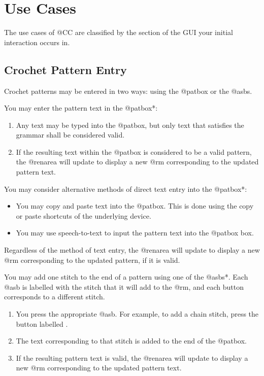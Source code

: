 \documentclass[main.tex]{subfiles}
\begin{document}
\chapter{Use Cases}\label{chp:use}

The use cases of @CC are classified by the section of the GUI your initial interaction occurs in.

\section{Crochet Pattern Entry}

Crochet patterns may be entered in two ways: using the @patbox or the @asbs.

You may enter the pattern text in the @patbox*:
\begin{enumerate}
\item Any text may be typed into the @patbox, but only text that satisfies the grammar shall be considered valid.
\item If the resulting text within the @patbox is considered to be a valid pattern, the @renarea will update to display a new @rm corresponding to the updated pattern text. 
\end{enumerate}

You may consider alternative methods of direct text entry into the @patbox*:
\begin{itemize}
\item You may copy and paste text into the @patbox. This is done using the copy or paste shortcuts of the underlying device.
\item You may use speech-to-text to input the pattern text into the @patbox box.
\end{itemize}
Regardless of the method of text entry, the @renarea will update to display a new @rm corresponding to the updated pattern, if it is valid.


You may add one stitch to the end of a pattern using one of the @asbs*. Each @asb is labelled with the stitch that it will add to the @rm, and each button corresponds to a different stitch. 

\begin{enumerate}
\item You press the appropriate @asb. For example, to add a chain stitch, press the button labelled .
\item The text corresponding to that stitch is added to the end of the @patbox.
\item If the resulting pattern text is valid, the @renarea will update to display a new @rm corresponding to the updated pattern text. 
\end{enumerate}
\end{document}
